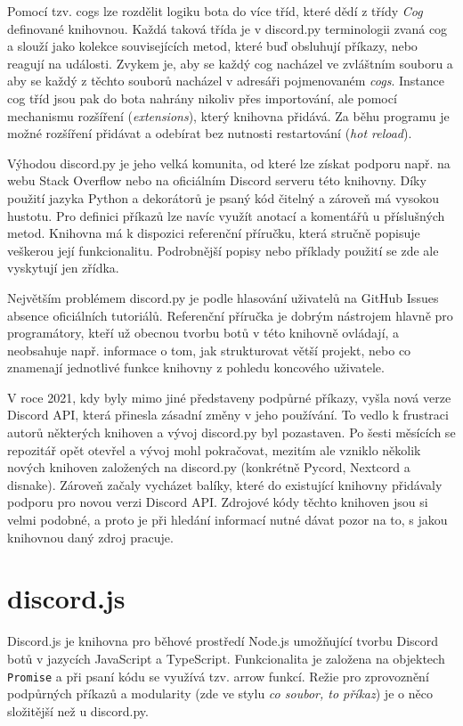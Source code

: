 \documentclass[FM]{tulthesis}
\begin{document}
	Pomocí tzv. cogs lze rozdělit logiku bota do více tříd, které dědí z třídy \textit{Cog} definované knihovnou. Každá taková třída je v discord.py terminologii zvaná cog a slouží jako kolekce souvisejících metod, které buď obsluhují příkazy, nebo reagují na události. Zvykem je, aby se každý cog nacházel ve zvláštním souboru a aby se každý z těchto souborů nacházel v adresáři pojmenovaném \textit{cogs}. Instance cog tříd jsou pak do bota nahrány nikoliv přes importování, ale pomocí mechanismu rozšíření (\textit{extensions}), který knihovna přidává. Za běhu programu je možné rozšíření přidávat a odebírat bez nutnosti restartování (\textit{hot reload}).
	
	Výhodou discord.py je jeho velká komunita, od které lze získat podporu např. na webu Stack Overflow nebo na oficiálním Discord serveru této knihovny. Díky použití jazyka Python a dekorátorů je psaný kód čitelný a zároveň má vysokou hustotu. Pro definici příkazů lze navíc využít anotací a komentářů u příslušných metod. Knihovna má k dispozici referenční příručku, která stručně popisuje veškerou její funkcionalitu. Podrobnější popisy nebo příklady použití se zde ale vyskytují jen zřídka.
	
	Největším problémem discord.py je podle hlasování uživatelů na GitHub \mbox{Issues} absence oficiálních tutoriálů. Referenční příručka je dobrým nástrojem hlavně pro programátory, kteří už obecnou tvorbu botů v této knihovně ovládají, a neobsahuje např. informace o tom, jak strukturovat větší projekt, nebo co znamenají jednotlivé funkce knihovny z pohledu koncového uživatele.
	
	V roce 2021, kdy byly mimo jiné představeny podpůrné příkazy, vyšla nová verze Discord API, která přinesla zásadní změny v jeho používání. To vedlo k frustraci autorů některých knihoven a vývoj discord.py byl pozastaven. Po šesti měsících se repozitář opět otevřel a vývoj mohl pokračovat, mezitím ale vzniklo několik nových knihoven založených na discord.py (konkrétně Pycord, Nextcord a disnake). Zároveň začaly vycházet balíky, které do existující knihovny přidávaly podporu pro novou verzi Discord API. Zdrojové kódy těchto knihoven jsou si velmi podobné, a proto je při hledání informací nutné dávat pozor na to, s jakou knihovnou daný zdroj pracuje.
	
	\section{discord.js}
	
	Discord.js je knihovna pro běhové prostředí Node.js umožňující tvorbu Discord botů v jazycích JavaScript a TypeScript. Funkcionalita je založena na objektech \verb|Promise| a při psaní kódu se využívá tzv. arrow funkcí. Režie pro zprovoznění podpůrných příkazů a modularity (zde ve stylu \textit{co soubor, to příkaz}) je o něco složitější než u discord.py.
	
\end{document}

